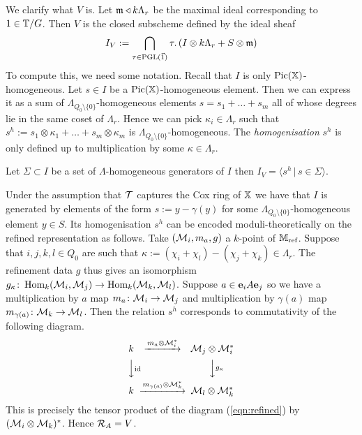 \documentclass[12pt]{amsart}
\begin{document}
We clarify what $V$ is. 
Let $\mathfrak{m}\triangleleft k\Lambda_r$ be the maximal ideal corresponding to $1 \in \mathbb{T}/G$. 
Then $V$ is the closed subscheme defined by the ideal sheaf
$$ I_V := \bigcap_{\tau \in \operatorname{PGL}(\vec{1})} \tau.\left(I \otimes k\Lambda_r + S \otimes \mathfrak{m} \right)$$
To compute this, we need some notation. 
Recall that $I$ is only $\operatorname{Pic}(\mathbb{X})$-homogeneous. Let $s \in I$ be a $\operatorname{Pic}(\mathbb{X})$-homogeneous element. 
Then we can express it as a sum of $\Lambda_{Q_0\setminus\{0\}}$-homogeneous elements $s = s_1 + \ldots + s_m$ all of whose degrees lie in the same coset of $\Lambda_r$. 
Hence we can pick $\kappa_i \in \Lambda_r$ such that $s^h := s_1 \otimes \kappa_1 + \ldots + s_m \otimes \kappa_m$ is $\Lambda_{Q_0\setminus\{0\}}$-homogeneous. 
The {\em homogenisation} $s^h$ is only defined up to multiplication by some $\kappa \in \Lambda_r$. 

\begin{lemma}
Let $\Sigma \subset I$ be a set of $\Lambda$-homogeneous generators of $I$ then $I_V = \langle s^h \,|\, s \in \Sigma \rangle.$ 
\end{lemma}

Under the assumption that $\mathcal{T}$ captures the Cox ring of $\mathbb{X}$ we have that $I$ is generated by elements of the form $s:= y - \gamma (y)$ for some $\Lambda_{Q_0\setminus\{0\}}$-homogeneous element $y \in S$.
Its homogenisation $s^h$ can be encoded moduli-theoretically on the refined representation as follows.
Take $(\mathcal{M}_i, m_a, g)$ a $k$-point of $\mathbb{M}_\text{ref}$.
Suppose that $i,j,k,l \in Q_0$ are such that $\kappa:= (\chi_i + \chi_l)-(\chi_j + \chi_k) \in \Lambda_r$. 
The refinement data $g$ thus gives an isomorphism $g_{\kappa} \colon \operatorname{Hom}_k(\mathcal{M}_i,\mathcal{M}_j) \to \operatorname{Hom}_k(\mathcal{M}_k,\mathcal{M}_l)$. 
Suppose $a \in \mathbf{e}_i A \mathbf{e}_j$ so we have a  multiplication by $a$ map $m_a \colon \mathcal{M}_i \to \mathcal{M}_j$ and multiplication by $\gamma(a)$ map $m_{\gamma(a)} \colon  \mathcal{M}_{k} \to \mathcal{M}_{l}$. Then the relation $s^h$ corresponds to commutativity of the following diagram. 
\begin{equation}  \label{eq:refined}
\begin{CD}
k @>m_a \otimes \cM_{i}^*>> \cM_{j} \otimes \cM_{i}^*\\
@VV\text{id}V @VV{g_\kappa}V\\
k @>m_{\gamma(a)}\otimes \cM_{k}^*>> \cM_{l} \otimes \cM_{k}^*
\end{CD}
\end{equation}
This is precisely the tensor product of the diagram (\ref{eqn:refined}) by $(\mathcal{M}_i \otimes \mathcal{M}_k)^*$.
Hence $\mathcal{R}_A = V$.
\end{document}
